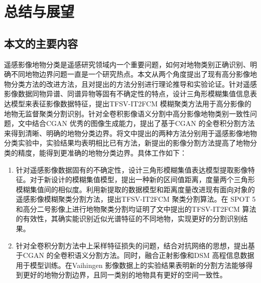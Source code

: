 
\chapter{总结与展望}
\label{cha:chap05}

\section{本文的主要内容}
\label{sec:5-1}
遥感影像地物分类是遥感研究领域内一个重要问题，如何对地物类别正确识别、明确不同地物边界问题一直是一个研究热点。本文从两个角度提出了现有高分影像地物分类方法的改进方法，且对提出的方法分别进行理论推导和实验论证。针对遥感影像数据同物异谱、同谱异物等固有不确定性的特点，设计三角形模糊集值信息表达模型来表征影像数据特征，提出TFSV-IT2FCM 模糊聚类方法用于高分影像的地物无监督聚类分割识别。针对全卷积影像语义分割中高分影像地物类别一致性问题，文中结合CGAN 优秀的图像生成能力，提出了基于CGAN 的全卷积分割方法来得到清晰、明确的地物分类边界。将文中提出的两种方法分别用于遥感影像地物分类实验中，实验结果均表明相比已有方法，新提出的影像分割方法提高了地物分类的精度，能得到更准确的地物分类边界。具体工作如下：
\begin{enumerate}[(1)]
  \item 针对遥感影像数据固有的不确定性，设计三角形模糊集值表达模型提取影像特征。对于新设计的模糊集值模型，提出一种新的区间值距离，度量两个三角形模糊集值间的相似度。利用新提取的数据模型和距离度量改进现有面向对象的遥感影像模糊聚类分割方法，提出TFSV-IT2FCM 聚类分割算法。在 SPOT 5和高分二号影像上进行地物聚类分割均证明了文中提出的TFSV-IT2FCM 算法的有效性，其确实能识别近似光谱特征的不同地物，实现更好的分割识别结果。
  \item 针对全卷积分割方法中上采样特征损失的问题，结合对抗网络的思想，提出基于CGAN 的全卷积语义分割方法。同时，融合正射影像和DSM 高程信息数据用于模型训练。在Vaihingen 影像数据上的实验结果表明新的分割方法能够得到更好的地物分割边界，且同一类别的地物具有更好的空间一致性。
\end{enumerate}


